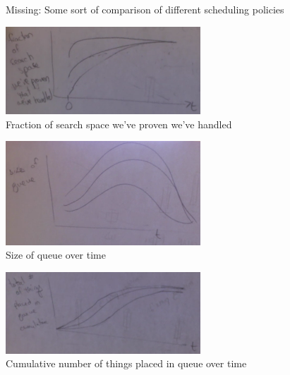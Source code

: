 \begin{figure}[t!]
\begin{center}
\end{center}
\caption{Missing:  Some sort of comparison of different scheduling policies}
\label{fig:scheduling-policy}
\end{figure}

\begin{figure}[t!]
\begin{center}
\includegraphics[width=0.65\textwidth]{figs/sketch-search-space.png}
\end{center}
\caption{Fraction of search space we've proven we've handled}
\label{fig:search-space}
\end{figure}

\begin{figure}[t!]
\begin{center}
\includegraphics[width=0.65\textwidth]{figs/sketch-queue-size.png}
\end{center}
\caption{Size of queue over time}
\label{fig:queue-size}
\end{figure}

\begin{figure}[t!]
\begin{center}
\includegraphics[width=0.65\textwidth]{figs/sketch-queue-cumulative.png}
\end{center}
\caption{Cumulative number of things placed in queue over time}
\label{fig:queue-cumulative}
\end{figure}

